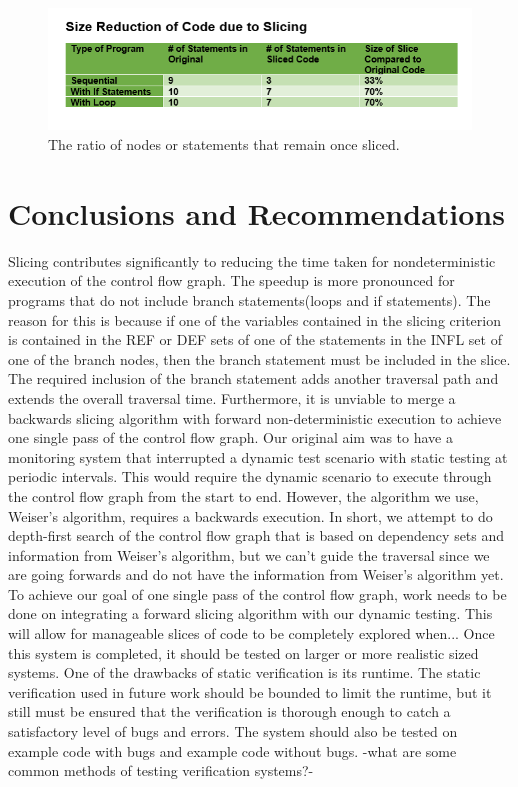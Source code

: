 \documentclass[peerreview]{IEEEtran}
\begin{document}
\begin{figure}[!h]
\centering
\includegraphics[width=0.8\columnwidth]{SlicedPercentage} 
\caption{The ratio of nodes or statements that remain once sliced.}
\label{fig_sim}
\end{figure}


\section{Conclusions and Recommendations}
	Slicing contributes significantly to reducing the time taken for nondeterministic execution of the control flow graph. The speedup is more pronounced for programs that do not include branch statements(loops and if statements). The reason for this is because if one of the variables contained in the slicing criterion is contained in the REF or DEF sets of one of the statements in the INFL set of one of the branch nodes, then the branch statement must be included in the slice. The required inclusion of the branch statement adds another traversal path and extends the overall traversal time.
	Furthermore, it is unviable to merge a backwards slicing algorithm with forward non-deterministic execution to achieve one single pass of the control flow graph. Our original aim was to have a monitoring system that interrupted a dynamic test scenario with static testing at periodic intervals. This would require the dynamic scenario to execute through the control flow graph from the start to end. However, the algorithm we use, Weiser’s algorithm, requires a backwards execution. In short, we attempt to do depth-first search of the control flow graph that is based on dependency sets and information from Weiser’s algorithm, but we can’t guide the traversal since we are going forwards and do not have the information from Weiser’s algorithm yet.
    	To achieve our goal of one single pass of the control flow graph, work needs to be done on integrating a forward slicing algorithm with our dynamic testing. This will allow for manageable slices of code to be completely explored when...
Once this system is completed, it should be tested on larger or more realistic sized systems. One of the drawbacks of static verification is its runtime. The static verification used in future work should be bounded to limit the runtime, but it still must be ensured that the verification is thorough enough to catch a satisfactory level of bugs and errors. The system should also be tested on example code with bugs and example code without bugs.
-what are some common methods of testing verification systems?-
\end{document}
